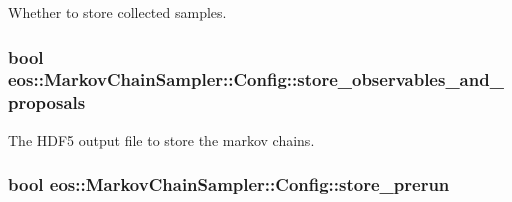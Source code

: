 Whether to store collected samples. \hypertarget{classeos_1_1MarkovChainSampler_1_1Config_aeeea2452cd313ebe9a695c98bdeceeee}{
\subsubsection[{store\_\-observables\_\-and\_\-proposals}]{\setlength{\rightskip}{0pt plus 5cm}bool {\bf eos::MarkovChainSampler::Config::store\_\-observables\_\-and\_\-proposals}}}
\label{classeos_1_1MarkovChainSampler_1_1Config_aeeea2452cd313ebe9a695c98bdeceeee}
The HDF5 output file to store the markov chains. \hypertarget{classeos_1_1MarkovChainSampler_1_1Config_a9fecfcf6c6ce24b34d1370dd1d222d06}{
\subsubsection[{store\_\-prerun}]{\setlength{\rightskip}{0pt plus 5cm}bool {\bf eos::MarkovChainSampler::Config::store\_\-prerun}}}
\label{classeos_1_1MarkovChainSampler_1_1Config_a9fecfcf6c6ce24b34d1370dd1d222d06}


